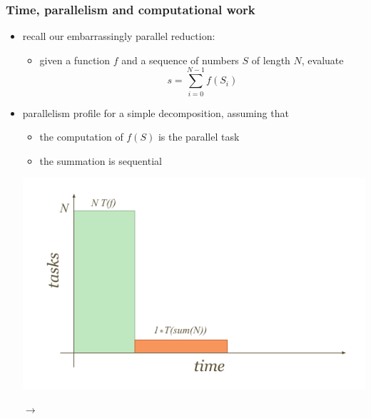 %
%
%
%


\begin{frame}[fragile]
%
  \frametitle{Time, parallelism and computational work}
%
  \begin{itemize}
  \item recall our embarrassingly parallel reduction: 
    \begin{itemize}
    \item given a function $f$ and a sequence of numbers $S$ of length $N$, evaluate
    \[
    s = \sum_{i=0}^{N-1}f(S_{i})
    \]
    \end{itemize}
%
  \item parallelism profile for a simple decomposition, assuming that
    \begin{itemize}
    \item the computation of $f(S)$ is the parallel task
    \item the summation is sequential
    \end{itemize}
%
    \begin{minipage}{.45\linewidth}
      \includegraphics[scale=0.5]{figures/reduction-parallel-work.pdf}
    \end{minipage}
    $\longrightarrow$
    \begin{minipage}{.45\linewidth}

\end{minipage}
\end{itemize}
\end{frame}
